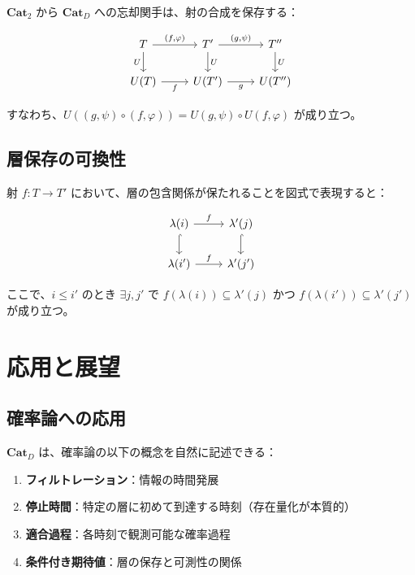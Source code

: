 \documentclass[a4paper,12pt]{ltjsarticle}
\begin{document}
$\mathbf{Cat}_2$ から $\mathbf{Cat}_D$ への忘却関手は、射の合成を保存する：

\begin{equation*}
\begin{tikzcd}
T \arrow[r, "{(f, \varphi)}"] \arrow[d, "U"']
  & T' \arrow[r, "{(g, \psi)}"] \arrow[d, "U"]
  & T'' \arrow[d, "U"] \\
U(T) \arrow[r, "f"']
  & U(T') \arrow[r, "g"']
  & U(T'')
\end{tikzcd}
\end{equation*}

すなわち、$U((g, \psi) \circ (f, \varphi)) = U(g, \psi) \circ U(f, \varphi)$ が成り立つ。

\subsection{層保存の可換性}

射 $f: T \to T'$ において、層の包含関係が保たれることを図式で表現すると：

\begin{equation*}
\begin{tikzcd}
\lambda(i) \arrow[r, "f"] \arrow[d, hookrightarrow]
  & \lambda'(j) \arrow[d, hookrightarrow] \\
\lambda(i') \arrow[r, "f"]
  & \lambda'(j')
\end{tikzcd}
\end{equation*}

ここで、$i \leq i'$ のとき $\exists j, j'$ で $f(\lambda(i)) \subseteq \lambda'(j)$ かつ
$f(\lambda(i')) \subseteq \lambda'(j')$ が成り立つ。

\section{応用と展望}

\subsection{確率論への応用}

$\mathbf{Cat}_D$ は、確率論の以下の概念を自然に記述できる：

\begin{enumerate}
  \item \textbf{フィルトレーション}：情報の時間発展
  \item \textbf{停止時間}：特定の層に初めて到達する時刻（存在量化が本質的）
  \item \textbf{適合過程}：各時刻で観測可能な確率過程
  \item \textbf{条件付き期待値}：層の保存と可測性の関係
\end{enumerate}
\end{document}
